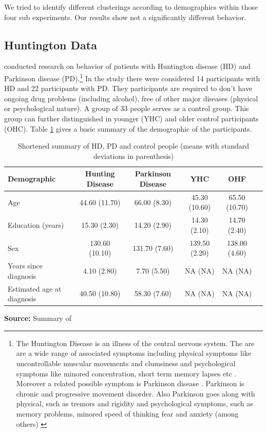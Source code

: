 \documentclass[12pt,a4paper,bibliography=totocnumbered,listof=totocnumbered]{scrartcl}
\begin{document}
We tried to identify different clusterings according to demographics within those four sub experiments. Our results show not a significantly different behavior. 

\subsection{Huntington Data}

\cite{Stout2001} conducted research on behavior of patients with Huntington disease (HD) and Parkinson disease (PD).\footnote{The Huntington Disease is an illness of the central nervous system. The are are a wide range of associated symptoms including physical symptoms like uncontrollable muscular movements and clumsiness and psychological symptoms like minored concentration, short term memory lapses etc . Moreover a related possible symptom is Parkinson disease \cite{hunt}. Parkinson is chronic and progressive movement  disorder. Also Parkinson goes along with physical, such as tremors and rigidity and psychological symptoms, such as memory problems, minored speed of thinking fear and anxiety (among others) \cite{parc}} 
In the study there were considered 14 participants with HD and 22 participants with PD. They participants are required to don't have ongoing drug problems (including alcohol), free of other major diseases (physical or psychological nature). A group of 33 people serves as a control group. This group can further distinguished in younger (YHC) and older control participants (OHC). Table \ref{tab:hus} gives a basic summary of the demographic of the participants.

\setlength{\tabcolsep}{10pt}
\renewcommand{\arraystretch}{1}
\begin{table}[!htbp]
	\centering 
	\scriptsize
	\begin{tabularx}{\textwidth}{lccccc}
		\toprule
		\textbf{Demographic} & \textbf{Hunting Disease} & \textbf{Parkinson Disease} & \textbf{YHC} & \textbf{OHF} \\
		\hline
		Age & 		44.60 (11.70) & 66.00 (8.30) & 45.30 (10.60) & 65.50 (10.70) \\
		Education (years) & 15.30 (2.30) & 14.20 (2.90) & 14.30 (2.10) &14.70 (2.40) \\
		Sex & 130.60 (10.10) & 131.70 (7.60) & 139.50 (2.20) & 138.00 (4.60) \\
		Years since diagnosis & 4.10 (2.80) & 7.70 (5.50) & NA (NA) & NA (NA) \\
		Estimated age at diagnosis & 40.50 (10.80) & 58.30 (7.60) & NA (NA) & NA (NA) \\
		\bottomrule
	\end{tabularx}
	\caption{Shortened summary of HD, PD and control people (means with standard deviations in parenthesis)}
	\label{tab:hus}
	\textbf{Source:} Summary of \cite[page 3]{Stout2001} 
\end{table}
\end{document}
